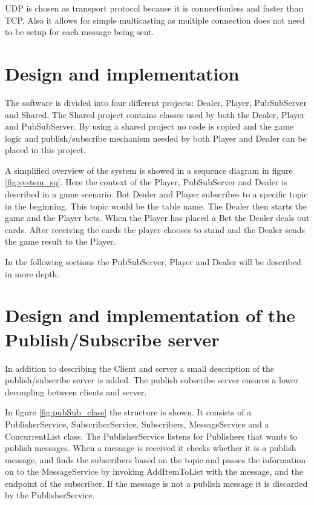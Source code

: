 
UDP is chosen as transport protocol because it is connectionless and faster than TCP. Also it allows for simple multicasting as multiple connection does not need to be setup for each message being sent.

\section{Design and implementation}
The software is divided into four different projects: Dealer, Player, PubSubServer and Shared. The Shared project contains classes used by both the Dealer, Player and PubSubServer. By using a shared project no code is copied and the game logic and publish/subscribe mechanism needed by both Player and Dealer can be placed in this project.

A simplified overview of the system is showed in a sequence diagram in figure \ref{fig:system_sq}. Here the context of the Player, PubSubServer and Dealer is described in a game scenario. Bot Dealer and Player subscribes to a specific topic in the beginning. This topic would be the table name. The Dealer then starts the game and the Player bets. When the Player has placed a Bet the Dealer deals out cards. After receiving the cards the player chooses to stand and the Dealer sends the game result to the Player. 

\FloatBarrier

In the following sections the PubSubServer, Player and Dealer will be described in more depth.

\section{Design and implementation of the Publish/Subscribe server}
In addition to describing the Client and server a small description of the publish/subscribe server is added. The publish subscribe server ensures a lower decoupling between clients and server.


In figure \ref{fig:pubSub_class} the structure is shown. It consists of a PublisherService, SubscriberService, Subscribers, MessageService and a ConcurrentList class. The PublisherService listens for Publishers that wants to publish messages. When a message is received it checks whether it is a publish message, and finds the subscribers based on the topic and passes the information on to the MessageService by invoking AddItemToList with the message, and the endpoint of the subscriber. If the message is not a publish message it is discarded by the PublisherService.


